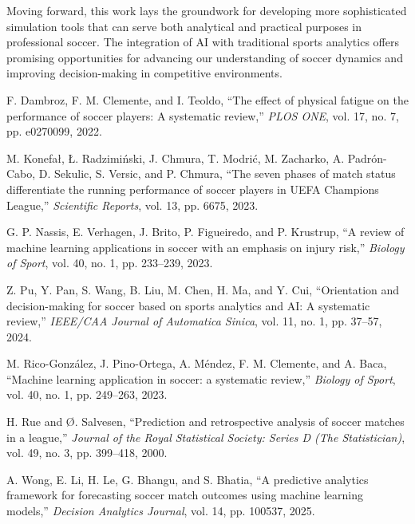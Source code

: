 \documentclass[10pt,journal,compsoc]{IEEEtran}
\begin{document}
Moving forward, this work lays the groundwork for developing more sophisticated simulation tools that can serve both analytical and practical purposes in professional soccer. The integration of AI with traditional sports analytics offers promising opportunities for advancing our understanding of soccer dynamics and improving decision-making in competitive environments.
\begin{thebibliography}{99}

F. Dambroz, F. M. Clemente, and I. Teoldo,
``The effect of physical fatigue on the performance of soccer players: A systematic review,''
\textit{PLOS ONE},
vol. 17, no. 7, pp. e0270099,
2022.

M. Konefał, Ł. Radzimiński, J. Chmura, T. Modrić, M. Zacharko, A. Padrón-Cabo, D. Sekulic, S. Versic, and P. Chmura,
``The seven phases of match status differentiate the running performance of soccer players in UEFA Champions League,''
\textit{Scientific Reports},
vol. 13, pp. 6675,
2023.

G. P. Nassis, E. Verhagen, J. Brito, P. Figueiredo, and P. Krustrup,
``A review of machine learning applications in soccer with an emphasis on injury risk,''
\textit{Biology of Sport},
vol. 40, no. 1, pp. 233--239,
2023.

Z. Pu, Y. Pan, S. Wang, B. Liu, M. Chen, H. Ma, and Y. Cui, 
``Orientation and decision-making for soccer based on sports analytics and AI: A systematic review,''
\textit{IEEE/CAA Journal of Automatica Sinica},
vol. 11, no. 1, pp. 37--57,
2024.

M. Rico-González, J. Pino-Ortega, A. Méndez, F. M. Clemente, and A. Baca,
``Machine learning application in soccer: a systematic review,''
\textit{Biology of Sport},
vol. 40, no. 1, pp. 249--263,
2023.

H. Rue and Ø. Salvesen,
``Prediction and retrospective analysis of soccer matches in a league,''
\textit{Journal of the Royal Statistical Society: Series D (The Statistician)},
vol. 49, no. 3, pp. 399--418,
2000.

A. Wong, E. Li, H. Le, G. Bhangu, and S. Bhatia,
``A predictive analytics framework for forecasting soccer match outcomes using machine learning models,''
\textit{Decision Analytics Journal},
vol. 14,
pp. 100537,
2025.

\end{thebibliography}
\end{document}
